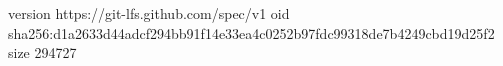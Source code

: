 version https://git-lfs.github.com/spec/v1
oid sha256:d1a2633d44adcf294bb91f14e33ea4c0252b97fdc99318de7b4249cbd19d25f2
size 294727
